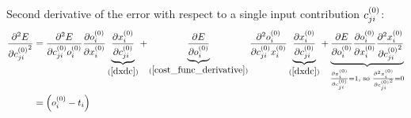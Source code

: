 Second derivative of the error with respect to a single input contribution $c_{ji}^{(0)}$:
\begin{align}
\pdv[2]{E}{{c_{ji}^{(0)}}} &=
\pdv{{^2}E}{{c_{ji}^{(0)}}{o_{i}^{(0)}}}
\pdv{o_{i}^{(0)}}{{x_{i}^{(0)}}} 
\underbrace{\pdv{x_{i}^{(0)}}{c_{ji}^{(0)}}}_{(\ref{dxdc})} 
+ 
\underbrace{\pdv{E}{{o_{i}^{(0)}}}}_{(\ref{cost_func_derivative})}
\pdv{{^2}{o_{i}^{(0)}}}{{c_{ji}^{(0)}}{x_{i}^{(0)}}} 
\underbrace{\pdv{{x_{i}^{(0)}}}{{c_{ji}^{(0)}}}}_{(\ref{dxdc})} 
+ 
\underbrace{\pdv{E}{{o_{i}^{(0)}}}
\pdv{{o_{i}^{(0)}}}{{x_{i}^{(0)}}}
\pdv[2]{{x_{i}^{(0)}}}{{c_{ji}^{(0)}}}}_{\pdv{{x_{i}^{(0)}}}{{c_{ji}^{(0)}}} = 1\text{, so } \pdv[2]{{x_{i}^{(0)}}}{{c_{ji}^{(0)}}} = 0}\\
&= \left(o_{i}^{(0)} - t_{i} \right)\
\label{zeroterm}
\end{align}

%
%
%
